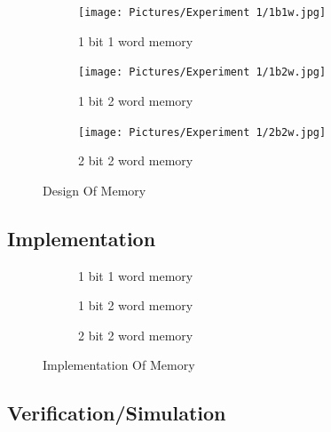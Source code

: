 \documentclass[a4paper]{article}
\begin{document}
\begin{figure}[h!]
    \centering
    \begin{subfigure}[b]{0.45\linewidth}
        \centering
        \texttt{[image: Pictures/Experiment 1/1b1w.jpg]}
        \caption{1 bit 1 word memory}
    \end{subfigure}
    \begin{subfigure}[b]{0.45\linewidth}
        \centering
        \texttt{[image: Pictures/Experiment 1/1b2w.jpg]}
        \caption{1 bit 2 word memory}
    \end{subfigure}
    \begin{subfigure}[b]{\linewidth}
        \centering
        \texttt{[image: Pictures/Experiment 1/2b2w.jpg]}
        \caption{2 bit 2 word memory}
    \end{subfigure}
    \caption{Design Of Memory}
    \label{Fig:MemDes}
\end{figure}
\pagebreak

\subsection{Implementation}
\begin{figure}[h!]
    \centering
    \begin{subfigure}[b]{0.4\linewidth}
        \centering
        \caption{1 bit 1 word memory}
    \end{subfigure}
    \begin{subfigure}[b]{0.4\linewidth}
        \centering
        \caption{1 bit 2 word memory}
    \end{subfigure}
    \begin{subfigure}[b]{\linewidth}
        \centering
        \caption{2 bit 2 word memory}
    \end{subfigure}
    \caption{Implementation Of Memory}
    \label{Fig:MemImp}
\end{figure}
\pagebreak

\subsection{Verification/Simulation}
\end{document}
